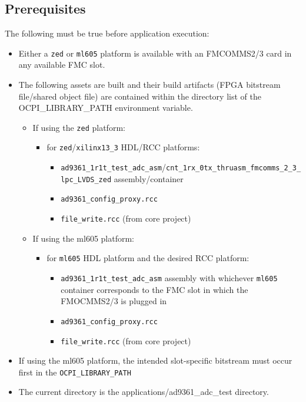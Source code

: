\subsection{Prerequisites}
The following must be true before application execution:
\begin{itemize}
  \item Either a \verb+zed+ or \verb+ml605+ platform is available with an FMCOMMS2/3 card in any available FMC slot.
  \item The following assets are built and their build artifacts (FPGA bitstream file/shared object file) are contained within the directory list of the OCPI\_LIBRARY\_PATH environment variable.
  \begin{itemize}
    \item If using the \verb+zed+ platform:
    \begin{itemize}
      \item for \verb+zed+/\verb+xilinx13_3+ HDL/RCC platforms:
      \begin{itemize}
        \item \verb+ad9361_1r1t_test_adc_asm+/\verb+cnt_1rx_0tx_thruasm_fmcomms_2_3_lpc_LVDS_zed+ assembly/container
        \item \verb+ad9361_config_proxy.rcc+
        \item \verb+file_write.rcc+ (from core project)
      \end{itemize}
    \end{itemize}
    \item If using the ml605 platform:
    \begin{itemize}
      \item for \verb+ml605+ HDL platform and the desired RCC platform:
      \begin{itemize}
        \item \verb+ad9361_1r1t_test_adc_asm+ assembly with whichever \verb+ml605+ container corresponds to the FMC slot in which the FMOCMMS2/3 is plugged in
        \item \verb+ad9361_config_proxy.rcc+
        \item \verb+file_write.rcc+ (from core project)
      \end{itemize}
    \end{itemize}
  \end{itemize}
\item If using the ml605 platform, the intended slot-specific bitstream must occur first in the \texttt{OCPI\_LIBRARY\_PATH}
\item The current directory is the applications/ad9361\_adc\_test directory.
\end{itemize}
